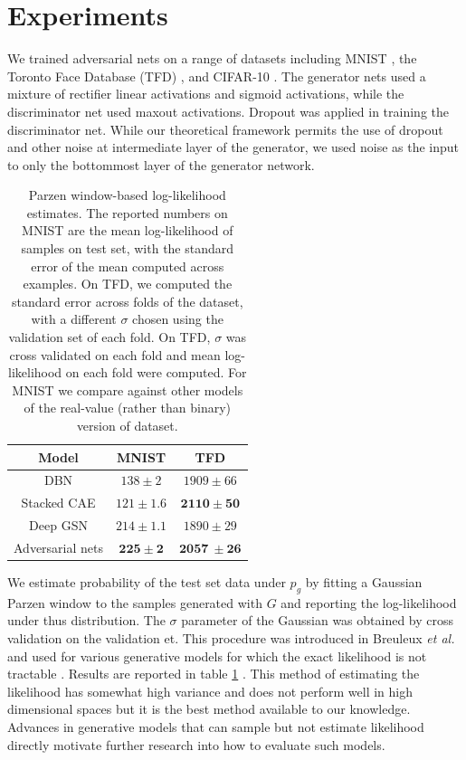 \section{Experiments}

We trained adversarial nets on
a range of datasets including MNIST \cite{23_lecun1998gradient}, the Toronto Face Database (TFD) \cite{28_susskind2010toronto}, and CIFAR-10 \cite{21_krizhevsky2009learning}. The generator nets used a mixture of rectifier linear activations \cite{19_5459469,9_pmlr-v15-glorot11a} and sigmoid activations, while the discriminator net used maxout \cite{10_goodfellow2013maxoutnetworks} activations. Dropout \cite{17_hinton2012improvingneuralnetworkspreventing} was applied in training the discriminator net. While our theoretical framework permits the use of dropout and other noise at intermediate layer of the generator, we used noise as the input to only the bottommost layer of the generator network.

\begin{table}[ht]
	\centering
	\begin{tabular}{c|c|c}
		Model & MNIST & TFD\\
		\hline
		DBN \cite{3_pmlr-v28-bengio13} & $138 \pm 2$ & $1909 \pm 66$\\
		Stacked CAE \cite{3_pmlr-v28-bengio13} & $121 \pm 1.6$ & $\boldsymbol{2110 \pm 50}$\\
		Deep GSN \cite{6_pmlr-v32-bengio14} & $214 \pm 1.1$ & $1890 \pm 29$\\
		Adversarial nets & $\boldsymbol{225 \pm 2}$ & $\boldsymbol{2057\ \pm 26}$\\
	\end{tabular}
	\caption{Parzen window-based log-likelihood estimates. The reported numbers on MNIST are the mean log-likelihood of samples on test set, with the standard error of the mean computed across examples. On TFD, we computed the standard error across folds of the dataset, with a different $\sigma$ chosen using the validation set of each fold. On TFD, $\sigma$ was cross validated on each fold and mean log-likelihood on each fold were computed. For MNIST we compare against other models of the real-value (rather than binary) version of dataset.}
	\label{table: table 1}
\end{table}

We estimate probability of the test set data under $p_g$ by fitting a Gaussian Parzen window to the samples generated with $G$ and reporting the log-likelihood under thus distribution. The $\sigma$ parameter of the Gaussian was obtained by cross validation on the validation et. This procedure was introduced in Breuleux \emph{et al.} \cite{8_6796083} and used for various generative models for which the exact likelihood is not tractable \cite{25_10.5555/3042573.3042804,3_pmlr-v28-bengio13,5_bengio2014deepgenerativestochasticnetworks}. Results are reported in table \ref{table: table 1}
. This method of estimating the likelihood has somewhat high variance and does not perform well in high dimensional spaces but it is the best method available to our knowledge. Advances in generative models that can sample but not estimate likelihood directly motivate further research into how to evaluate such models.

